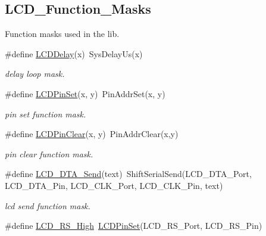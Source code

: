 \subsection*{L\-C\-D\-\_\-\-Function\-\_\-\-Masks}
\label{_amgrpeb574f17a571b653204a8755139b13d5}%
Function masks used in the lib. \begin{DoxyCompactItemize}
\item 
\hypertarget{group__lcd__h_gabba7f6ce117ebde044aefb40b6ec8dc1}{\#define \hyperlink{group__lcd__h_gabba7f6ce117ebde044aefb40b6ec8dc1}{L\-C\-D\-Delay}(x)~Sys\-Delay\-Us(x)}\label{group__lcd__h_gabba7f6ce117ebde044aefb40b6ec8dc1}

\begin{DoxyCompactList}\small\item\em delay loop mask. \end{DoxyCompactList}\item 
\hypertarget{group__lcd__h_ga3bc70b31cd1ab9a95b44befeca6f4f42}{\#define \hyperlink{group__lcd__h_ga3bc70b31cd1ab9a95b44befeca6f4f42}{L\-C\-D\-Pin\-Set}(x, y)~Pin\-Addr\-Set(x, y)}\label{group__lcd__h_ga3bc70b31cd1ab9a95b44befeca6f4f42}

\begin{DoxyCompactList}\small\item\em pin set function mask. \end{DoxyCompactList}\item 
\hypertarget{group__lcd__h_ga1279c3be6e3b6cefa1b1bee2325c8f93}{\#define \hyperlink{group__lcd__h_ga1279c3be6e3b6cefa1b1bee2325c8f93}{L\-C\-D\-Pin\-Clear}(x, y)~Pin\-Addr\-Clear(x,y)}\label{group__lcd__h_ga1279c3be6e3b6cefa1b1bee2325c8f93}

\begin{DoxyCompactList}\small\item\em pin clear function mask. \end{DoxyCompactList}\item 
\hypertarget{group__lcd__h_gad70516201ea275cdb7b698f8782bd0b6}{\#define \hyperlink{group__lcd__h_gad70516201ea275cdb7b698f8782bd0b6}{L\-C\-D\-\_\-\-D\-T\-A\-\_\-\-Send}(text)~Shift\-Serial\-Send(L\-C\-D\-\_\-\-D\-T\-A\-\_\-\-Port, L\-C\-D\-\_\-\-D\-T\-A\-\_\-\-Pin, L\-C\-D\-\_\-\-C\-L\-K\-\_\-\-Port, L\-C\-D\-\_\-\-C\-L\-K\-\_\-\-Pin, text)}\label{group__lcd__h_gad70516201ea275cdb7b698f8782bd0b6}

\begin{DoxyCompactList}\small\item\em lcd send function mask. \end{DoxyCompactList}\item 
\hypertarget{group__lcd__h_gabba12f2f22df7f046b7d5a4cd2e969b7}{\#define \hyperlink{group__lcd__h_gabba12f2f22df7f046b7d5a4cd2e969b7}{L\-C\-D\-\_\-\-R\-S\-\_\-\-High}~\hyperlink{group__lcd__h_ga3bc70b31cd1ab9a95b44befeca6f4f42}{L\-C\-D\-Pin\-Set}(L\-C\-D\-\_\-\-R\-S\-\_\-\-Port, L\-C\-D\-\_\-\-R\-S\-\_\-\-Pin)}\label{group__lcd__h_gabba12f2f22df7f046b7d5a4cd2e969b7}


\end{DoxyCompactItemize}
